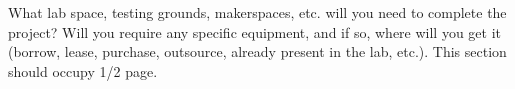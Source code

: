 What lab space, testing grounds, makerspaces, etc. will you need to complete the project? Will you require any specific equipment, and if so, where will you get it (borrow, lease, purchase, outsource, already present in the lab, etc.). This section should occupy 1/2 page.